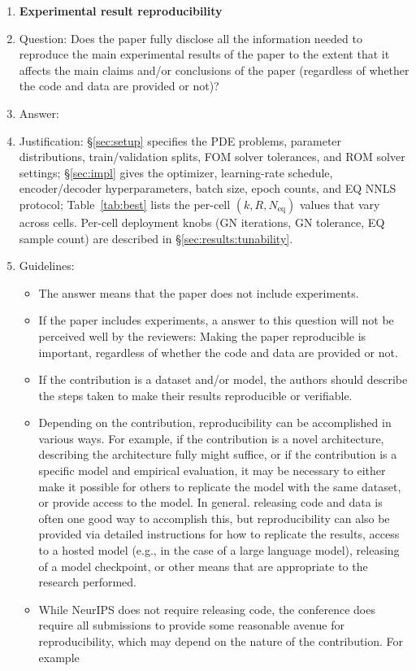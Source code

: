 \begin{enumerate}
    \item {\bf Experimental result reproducibility}
    \item[] Question: Does the paper fully disclose all the information needed to reproduce the main experimental results of the paper to the extent that it affects the main claims and/or conclusions of the paper (regardless of whether the code and data are provided or not)?
    \item[] Answer: \answerYes{}
    \item[] Justification: \S\ref{sec:setup} specifies the PDE problems, parameter distributions, train/validation splits, FOM solver tolerances, and ROM solver settings; \S\ref{sec:impl} gives the optimizer, learning-rate schedule, encoder/decoder hyperparameters, batch size, epoch counts, and EQ NNLS protocol; Table~\ref{tab:best} lists the per-cell $(k, R, N_\mathrm{eq})$ values that vary across cells. Per-cell deployment knobs (GN iterations, GN tolerance, EQ sample count) are described in \S\ref{sec:results:tunability}.
    \item[] Guidelines:
    \begin{itemize}
        \item The answer \answerNA{} means that the paper does not include experiments.
        \item If the paper includes experiments, a \answerNo{} answer to this question will not be perceived well by the reviewers: Making the paper reproducible is important, regardless of whether the code and data are provided or not.
        \item If the contribution is a dataset and\slash or model, the authors should describe the steps taken to make their results reproducible or verifiable. 
        \item Depending on the contribution, reproducibility can be accomplished in various ways. For example, if the contribution is a novel architecture, describing the architecture fully might suffice, or if the contribution is a specific model and empirical evaluation, it may be necessary to either make it possible for others to replicate the model with the same dataset, or provide access to the model. In general. releasing code and data is often one good way to accomplish this, but reproducibility can also be provided via detailed instructions for how to replicate the results, access to a hosted model (e.g., in the case of a large language model), releasing of a model checkpoint, or other means that are appropriate to the research performed.
        \item While NeurIPS does not require releasing code, the conference does require all submissions to provide some reasonable avenue for reproducibility, which may depend on the nature of the contribution. For example

\end{itemize}
\end{enumerate}
